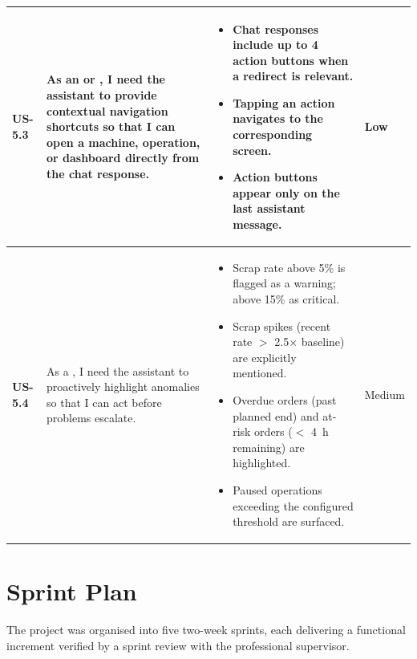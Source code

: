 \begin{longtable}{p{1.5cm} p{5cm} p{6.5cm} p{2cm}}
	\textbf{US-5.3} &
	As an \userrole{Operator} or \userrole{Supervisor}, I need the assistant to
	provide contextual navigation shortcuts so that I can open a machine, operation,
	or dashboard directly from the chat response.
	&
	\begin{itemize}[nosep, leftmargin=*]
	\item Chat responses include up to 4 action buttons when a redirect is relevant.
	\item Tapping an action navigates to the corresponding screen.
	\item Action buttons appear only on the last assistant message.
	\end{itemize}
	& Low \\ \midrule

	\textbf{US-5.4} &
	As a \userrole{Supervisor}, I need the assistant to proactively highlight
	anomalies so that I can act
	before problems escalate.
	&
	\begin{itemize}[nosep, leftmargin=*]
	\item Scrap rate above 5\% is flagged as a warning; above 15\% as critical.
	\item Scrap spikes (recent rate $>$ 2.5$\times$ baseline) are explicitly mentioned.
	\item Overdue orders (past planned end) and at-risk orders ($<$ 4~h remaining)
	are highlighted.
	\item Paused operations exceeding the configured threshold are surfaced.
	\end{itemize}
	& Medium \\
	\bottomrule
\end{longtable}


\section{Sprint Plan}

The project was organised into five two-week sprints, each delivering a
functional increment verified by a sprint review with the professional supervisor.

